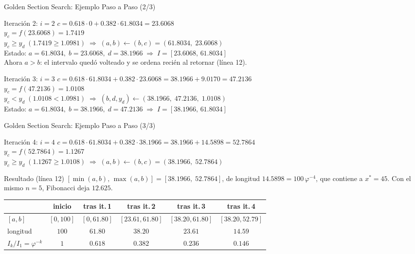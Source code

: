 \begin{frame}{Golden Section Search: Ejemplo Paso a Paso (2/3)}
    \scriptsize
    \begin{block}{Iteración 2: $i=2$}
        $c=0.618\cdot 0+0.382\cdot 61.8034=23.6068$\\[2pt]
        $y_c=f(23.6068)=1.7419$\\[2pt]
        $y_c\ge y_d\;(1.7419\ge 1.0981) \;\Rightarrow\; (a,b)\gets(b,c)=(61.8034,\;23.6068)$\\[2pt]
        Estado: $a=61.8034,\; b=23.6068,\; d=38.1966 \;\Rightarrow\; I=[23.6068,\,61.8034]$\\[2pt]
        {\tiny Ahora $a>b$: el intervalo quedó volteado y se ordena recién al retornar (línea 12).}
    \end{block}

    \begin{block}{Iteración 3: $i=3$}
        $c=0.618\cdot 61.8034+0.382\cdot 23.6068=38.1966+9.0170=47.2136$\\[2pt]
        $y_c=f(47.2136)=1.0108$\\[2pt]
        $y_c<y_d\;(1.0108< 1.0981) \;\Rightarrow\; (b,d,y_d)\gets(38.1966,\;47.2136,\;1.0108)$\\[2pt]
        Estado: $a=61.8034,\; b=38.1966,\; d=47.2136 \;\Rightarrow\; I=[38.1966,\,61.8034]$
    \end{block}
\end{frame}

\begin{frame}{Golden Section Search: Ejemplo Paso a Paso (3/3)}
    \scriptsize
    \begin{block}{Iteración 4: $i=4$}
        $c=0.618\cdot 61.8034+0.382\cdot 38.1966=38.1966+14.5898=52.7864$\\[2pt]
        $y_c=f(52.7864)=1.1267$\\[2pt]
        $y_c\ge y_d\;(1.1267\ge 1.0108) \;\Rightarrow\; (a,b)\gets(b,c)=(38.1966,\;52.7864)$
    \end{block}

    \begin{exampleblock}{Resultado (línea 12)}
        $[\min(a,b),\,\max(a,b)]=[38.1966,\;52.7864]$, de longitud $14.5898=100\,\varphi^{-4}$,
        que contiene a $x^{*}=45$. Con el mismo $n=5$, Fibonacci deja $12.625$.
    \end{exampleblock}

    \begin{center}
    \begin{tabular}{l c c c c c}
        \toprule
        & inicio & tras it.\,1 & tras it.\,2 & tras it.\,3 & tras it.\,4 \\
        \midrule
        $[a,b]$  & $[0,100]$ & $[0,61.80]$ & $[23.61,61.80]$ & $[38.20,61.80]$ & $[38.20,52.79]$ \\
        longitud & $100$ & $61.80$ & $38.20$ & $23.61$ & $14.59$ \\
        $I_k/I_1=\varphi^{-k}$ & $1$ & $0.618$ & $0.382$ & $0.236$ & $0.146$ \\
        \bottomrule
    \end{tabular}
    \end{center}
\end{frame}

